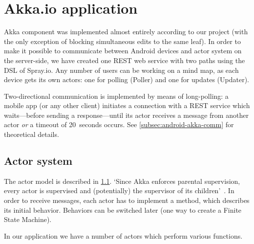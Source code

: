 %
%
%
%
%

\section{Akka.io application}
\label{sec:akka-app}

Akka component was implemented almost entirely according to our project (with the only exception of blocking simultaneous edits to the same leaf). In order to make it possible to communicate between Android devices and actor system on the server-side, we have created one REST web service with two paths using the DSL of Spray.io. Any number of users can be working on a mind map, as each device gets its own actors: one for polling (Poller) and one for updates (Updater).

Two-directional communication is implemented by means of long-polling: a mobile app (or any other client) initiates a connection with a REST service which waits---before sending a response---until its actor receives a message from another actor \emph{or} a timeout of 20~seconds occurs. See \cref{subsec:android-akka-comm} for theoretical details.  

\subsection{Actor system}
\label{subsection:akka-actors}
The actor model is described in \cref{subsection:akka-actors}. `Since Akka enforces parental supervision, every actor is supervised and (potentially) the supervisor of its children'~\cite{AkkaDoc:2013:Actors}. In order to receive messages, each actor has to implement a  method, which describes its initial behavior. Behaviors can be switched later (one way to create a Finite State Machine).

In our application we have a number of actors which perform various functions.

